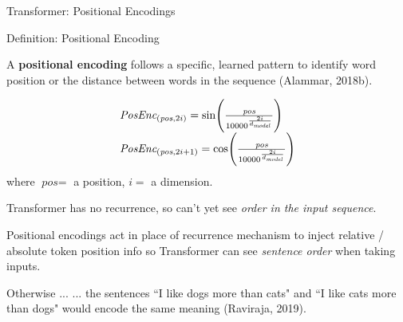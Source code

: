 \begin{frame}{Transformer: Positional Encodings}

    \begin{definitionBlock}{Definition: Positional Encoding}
        \normalsize 
        
        A \textbf{positional encoding} follows a specific, learned pattern to identify word position or the distance between words in the sequence (Alammar, 2018b). 
        
        $$
        \begin{array}{ll}
        \textit{PosEnc}_{\Large (\textit{pos}, 2i)} = \text{sin} \Bigg(\frac {\textit{pos}} {10000^{\Large \frac {2i} {d_{\textit{model}}} } }  \Bigg) \\
        \textit{PosEnc}_{\Large (\textit{pos}, 2i + 1)} = \text{cos} \Bigg(\frac {\textit{pos}} {10000^{\Large \frac {2i} {d_{\textit{model}}} } }  \Bigg)
        \end{array}
        $$
        where $\textit{pos} = $ a position, $i = $ a dimension.
    \end{definitionBlock}
    
    
    
    \begin{itemizeSpaced}{2pt}
        \pinkbox Transformer has no recurrence, so can't yet see \emph{order in the input sequence}. 
        
        \item Positional encodings act in place of recurrence mechanism to inject relative / absolute token position info so Transformer can see \emph{sentence order} when taking inputs.
        
        \begin{alertBlock}{Otherwise ...}
        ... the sentences ``I like dogs more than cats" and ``I like cats more than dogs" would encode the same meaning (Raviraja, 2019). 
        \end{alertBlock}
    \end{itemizeSpaced}
    
\end{frame}



